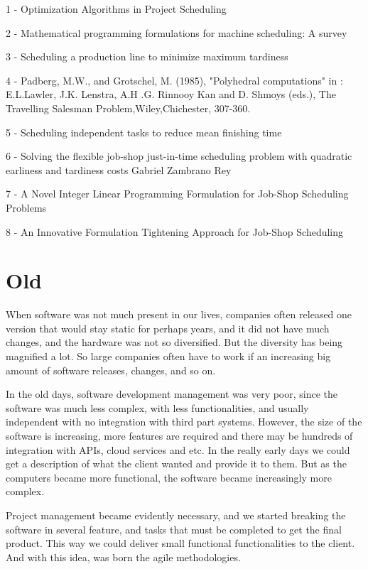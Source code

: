 \documentclass[12pt]{article}
\begin{document}
1 - Optimization Algorithms in Project Scheduling

2 - Mathematical programming formulations for machine scheduling: A survey

3 - Scheduling a production line to minimize maximum tardiness

4 - Padberg, M.W., and Grotschel, M. (1985), "Polyhedral computations" in : E.L.Lawler, J.K. Lenstra, A.H .G. Rinnooy Kan and D. Shmoys (eds.), The Travelling Salesman Problem,Wiley,Chichester, 307-360.

5 - Scheduling independent tasks to reduce mean finishing time 

6 - Solving the flexible job-shop just-in-time scheduling problem
with quadratic earliness and tardiness costs Gabriel Zambrano Rey

7 - A Novel Integer Linear Programming Formulation for Job-Shop
Scheduling Problems

8 - An Innovative Formulation Tightening Approach for Job-Shop
Scheduling

\section*{Old}

When software was not much present in our lives, companies often released one version that would stay static for perhaps years, and it did not have much changes, and the hardware was not so diversified. But the diversity has being magnified a lot. So large companies often have to work if an increasing big amount of software releases, changes, and so on.

In the old days, software development management was very poor, since the software was much less complex, with less functionalities, and usually independent with no integration with third part systems. However, the size of the software is increasing, more features are required and there may be hundreds of integration with APIs, cloud services and etc. In the really early days we could get a description of what the client wanted and provide it to them. But as the computers became more functional, the software became increasingly more complex. 

Project management became evidently necessary, and we started breaking the software in several feature, and tasks that must be completed to get the final product. This way we could deliver small functional functionalities to the client. And with this idea, was born the agile methodologies. 
\end{document}
